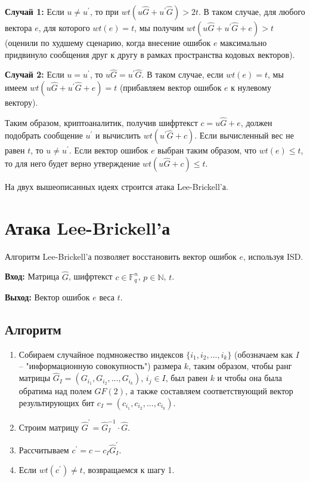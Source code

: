 \documentclass[12pt,a4paper]{scrartcl}
\begin{document}
\textbf{Случай 1:} Если $u \neq u^\prime$, то при $wt(u\hat{G}+u^\prime\hat{G})>2t$. В таком случае, для любого вектора $e$, для которого $wt(e)=t$, мы получим $wt(u\hat{G}+u^\prime\hat{G}+e)>t$ (оценили по худшему сценарию, когда внесение ошибок $e$ максимально придвинуло сообщения друг к другу в рамках пространства кодовых векторов).

\textbf{Случай 2:} Если $u = u^\prime$, то $u\hat{G}=u^\prime\hat{G}$. В таком случае, если $wt(e)=t$, мы имеем $wt(u\hat{G}+u^\prime\hat{G}+e)=t$ (прибавляем вектор ошибок $e$ к нулевому вектору).

Таким образом, криптоаналитик, получив шифртекст $c=u\hat{G}+e$, должен подобрать сообщение $u^\prime$ и вычислить $wt(u^\prime\hat{G}+c)$. Если вычисленный вес не равен $t$, то $u \neq u^\prime$. Если вектор ошибок $e$ выбран таким образом, что $wt(e) \leq t$, то для него будет верно утверждение $wt(u\hat{G}+c)\leq t$.

На двух вышеописанных идеях строится атака Lee-Brickell'а.

\section{Атака Lee-Brickell'а}

Алгоритм Lee-Brickell'а позволяет восстановить вектор ошибок $e$, используя ISD.

\textbf{Вход:} Матрица $\hat{G}$, шифртекст $c \in \mathbb{F}_q^n$, $p \in \mathbb{N}$, $t$.

\textbf{Выход:} Вектор ошибок $e$ веса $t$.

\subsection{Алгоритм}

\begin{enumerate}
	\item Собираем случайное подмножество индексов $\{i_1,i_2,...,i_k\}$ (обозначаем как $I$ -- "информационную совокупность") размера $k$, таким образом, чтобы ранг матрицы $\hat{G}_I = (G_{i_1},G_{i_2},...,G_{i_k})$, $i_j \in I$, был равен $k$ и чтобы она была обратима над полем $GF(2)$, а также составляем соответствующий вектор результирующих бит $c_I=(c_{i_1},c_{i_2},...,c_{i_k})$.
	\item Строим матрицу $\hat{G}^\prime=\hat{G}_I^{-1} \cdot \hat{G}$.
	\item Рассчитываем $c^\prime=c-c_I\hat{G}_I^\prime$.
	\item Если $wt(c^\prime) \neq t$, возвращаемся к шагу 1.
\end{enumerate}
\end{document}

